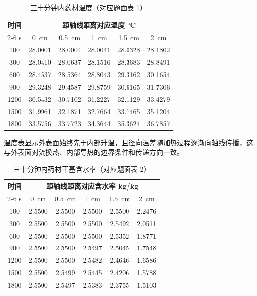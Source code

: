 \documentclass[withoutpreface,bwprint]{cumcmthesis}
\begin{document}
\begin{table}[htbp]
\centering
\caption{三十分钟内药材温度（对应题面表 1）}
\label{tab:q1-temperature}
\small
\begin{tabular}{cccccc}
\toprule
时间 & \multicolumn{5}{c}{距轴线距离对应温度 \si{\degreeCelsius}} \\
\cmidrule(lr){2-6}
\si{s} & \SI{0}{cm} & \SI{0.5}{cm} & \SI{1}{cm} & \SI{1.5}{cm} & \SI{2}{cm} \\
\midrule
100  & 28.0001 & 28.0004 & 28.0041 & 28.0328 & 28.1802 \\
300  & 28.0410 & 28.0637 & 28.1516 & 28.3683 & 28.8491 \\
600  & 28.4537 & 28.5364 & 28.8043 & 29.3162 & 30.1654 \\
900  & 29.3248 & 29.4587 & 29.8759 & 30.6165 & 31.7306 \\
1200 & 30.5432 & 30.7102 & 31.2227 & 32.1129 & 33.4279 \\
1500 & 31.9961 & 32.1871 & 32.7664 & 33.7465 & 35.1204 \\
1800 & 33.5756 & 33.7723 & 34.3644 & 35.3624 & 36.7857 \\
\bottomrule
\end{tabular}
\end{table}

温度表显示外表面始终先于内部升温，且径向温差随加热过程逐渐向轴线传播，这与外表面对流换热、内部导热的边界条件和传递方向一致。

\begin{table}[htbp]
\centering
\caption{三十分钟内药材干基含水率（对应题面表 2）}
\label{tab:q1-moisture}
\small
\begin{tabular}{cccccc}
\toprule
时间 & \multicolumn{5}{c}{距轴线距离对应含水率 \si{kg/kg}} \\
\cmidrule(lr){2-6}
\si{s} & \SI{0}{cm} & \SI{0.5}{cm} & \SI{1}{cm} & \SI{1.5}{cm} & \SI{2}{cm} \\
\midrule
100  & 2.5500 & 2.5500 & 2.5500 & 2.5500 & 2.2476 \\
300  & 2.5500 & 2.5500 & 2.5500 & 2.5492 & 2.0511 \\
600  & 2.5500 & 2.5500 & 2.5500 & 2.5352 & 1.8771 \\
900  & 2.5500 & 2.5500 & 2.5497 & 2.5045 & 1.7548 \\
1200 & 2.5500 & 2.5500 & 2.5482 & 2.4646 & 1.6586 \\
1500 & 2.5500 & 2.5499 & 2.5445 & 2.4206 & 1.5788 \\
1800 & 2.5500 & 2.5497 & 2.5383 & 2.3755 & 1.5103 \\
\bottomrule
\end{tabular}
\end{table}
\end{document}
